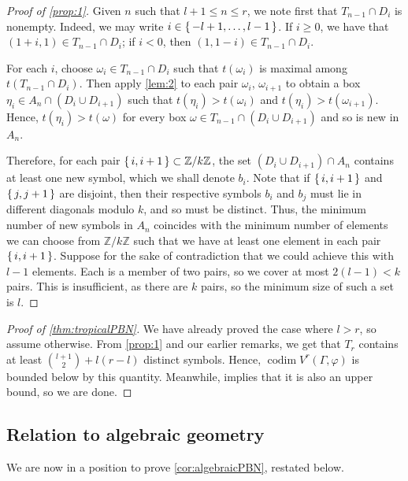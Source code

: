 \documentclass[11pt,reqno]{amsart}
\newcommand*{\Z}{\mathbb{Z}}
\DeclareMathOperator{\codim}{codim}
\theoremstyle{definition}
\theoremstyle{problem}
\theoremstyle{plain}
\theoremstyle{remark}
\theoremstyle{theorem}
\numberwithin{equation}{section}
\numberwithin{figure}{section}
\theoremstyle{definition}
\theoremstyle{problem}
\theoremstyle{plain}
\begin{document}
\begin{proof}[Proof of \cref{prop:1}]
  Given $n$ such that $l+1 \leq n \leq r$, we note first that
  $T_{n-1} \cap D_i$ is nonempty.  Indeed, we may write
  $i \in \set{-l+1,\ldots,l-1}$.  If $i \geq 0$, we have that
  $(1+i,1) \in T_{n-1} \cap D_i$; if $i < 0$, then
  $(1,1-i) \in T_{n-1} \cap D_i$.

  For each $i$, choose $\omega_i \in T_{n-1} \cap D_i$ such that
  $t(\omega_i)$ is maximal among $t(T_{n-1} \cap D_i)$.  Then apply
  \cref{lem:2} to each pair $\omega_i$, $\omega_{i+1}$ to obtain a box
  $\eta_i \in A_n \cap (D_i \cup D_{i+1})$ such that
  $t(\eta_i) > t(\omega_i)$ and $t(\eta_i) > t(\omega_{i+1})$.  Hence,
  $t(\eta_i) > t(\omega)$ for every box
  $\omega \in T_{n-1} \cap (D_i \cup D_{i+1})$ and so is new in $A_n$.

  Therefore, for each pair $\set{i,i+1} \subset \Z/k\Z$, the set
  $(D_i\cup D_{i+1})\cap A_n$ contains at least one new symbol, which
  we shall denote $b_i$.  Note that if $\set{i,i+1}$ and $\set{j,j+1}$
  are disjoint, then their respective symbols $b_i$ and $b_j$ must lie
  in different diagonals modulo $k$, and so must be distinct.  Thus,
  the minimum number of new symbols in $A_n$ coincides with the
  minimum number of elements we can choose from $\Z/k\Z$ such that we
  have at least one element in each pair $\set{i,i+1}$.  Suppose for
  the sake of contradiction that we could achieve this with $l-1$
  elements.  Each is a member of two pairs, so we cover at most
  $2(l-1)<k$ pairs.  This is insufficient, as there are $k$ pairs, so
  the minimum size of such a set is $l$.
\end{proof}

\begin{proof}[Proof of \cref{thm:tropicalPBN}]
  We have already proved the case where $l > r$, so assume otherwise.
  From \cref{prop:1} and our earlier remarks, we get that $T_r$
  contains at least $\binom{l+1}{2} + l(r-l)$ distinct symbols.
  Hence, $\codim V^r(\Gamma,\varphi)$ is bounded below by this
  quantity.  Meanwhile, \cite[Corollary~6.2.2, Remark~6.2.3]{len2019skeletons}
   implies that it is also
  an upper bound, so we are done.
\end{proof}

\subsection{Relation to algebraic
  geometry}\label{sec:algebraic-dim-proof}
We are now in a position to prove \cref{cor:algebraicPBN}, restated
below.  
\end{document}
